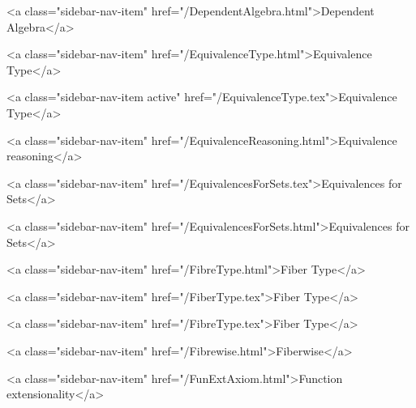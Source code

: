       
        
          <a class="sidebar-nav-item" href="/DependentAlgebra.html">Dependent Algebra</a>
        
      
    
      
        
          <a class="sidebar-nav-item" href="/EquivalenceType.html">Equivalence Type</a>
        
      
    
      
        
          <a class="sidebar-nav-item active" href="/EquivalenceType.tex">Equivalence Type</a>
        
      
    
      
        
          <a class="sidebar-nav-item" href="/EquivalenceReasoning.html">Equivalence reasoning</a>
        
      
    
      
        
          <a class="sidebar-nav-item" href="/EquivalencesForSets.tex">Equivalences for Sets</a>
        
      
    
      
        
          <a class="sidebar-nav-item" href="/EquivalencesForSets.html">Equivalences for Sets</a>
        
      
    
      
        
          <a class="sidebar-nav-item" href="/FibreType.html">Fiber Type</a>
        
      
    
      
        
          <a class="sidebar-nav-item" href="/FiberType.tex">Fiber Type</a>
        
      
    
      
        
          <a class="sidebar-nav-item" href="/FibreType.tex">Fiber Type</a>
        
      
    
      
        
          <a class="sidebar-nav-item" href="/Fibrewise.html">Fiberwise</a>
        
      
    
      
        
          <a class="sidebar-nav-item" href="/FunExtAxiom.html">Function extensionality</a>
        
